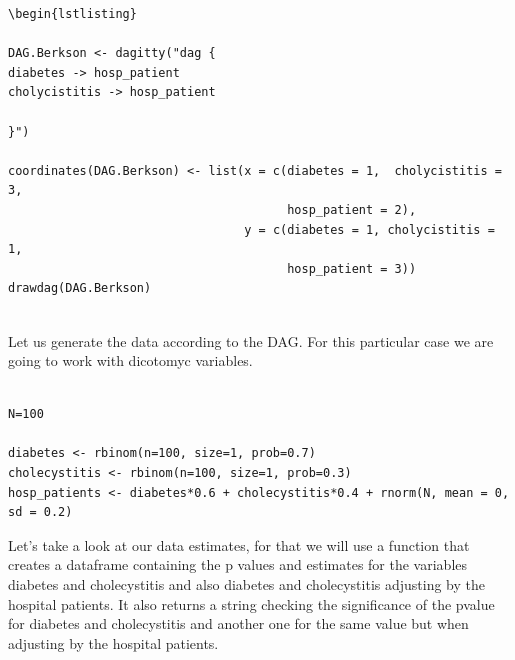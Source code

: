 \documentclass{article}
\begin{document}
\begin{lstlisting}
\begin{lstlisting}

DAG.Berkson <- dagitty("dag {
diabetes -> hosp_patient
cholycistitis -> hosp_patient

}")

coordinates(DAG.Berkson) <- list(x = c(diabetes = 1,  cholycistitis = 3, 
                                       hosp_patient = 2),
                                 y = c(diabetes = 1, cholycistitis = 1, 
                                       hosp_patient = 3))
drawdag(DAG.Berkson)


\end{lstlisting}



Let us generate the data according to the DAG. For this particular case we are going to work with dicotomyc variables.

\begin{lstlisting}

N=100

diabetes <- rbinom(n=100, size=1, prob=0.7)
cholecystitis <- rbinom(n=100, size=1, prob=0.3) 
hosp_patients <- diabetes*0.6 + cholecystitis*0.4 + rnorm(N, mean = 0, sd = 0.2)

\end{lstlisting}


Let's take a look at our data estimates, for that we will use a function that creates a dataframe containing the p values and estimates for the variables diabetes and cholecystitis and also diabetes and cholecystitis adjusting by the hospital patients. It also returns a string checking the  significance of the pvalue for diabetes and cholecystitis and another one for the same value but when adjusting by the hospital patients.
\end{document}
